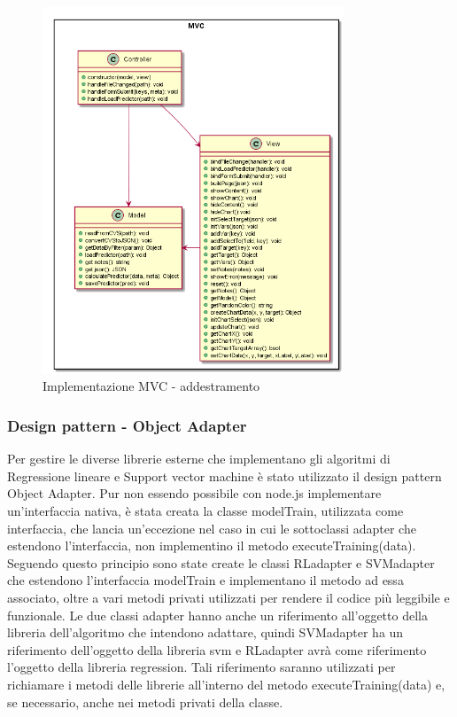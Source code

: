 \documentclass[../manuale-sviluppatore.tex]{subfiles}
\begin{document}
\begin{figure}[h]
    \begin{center}
         \includegraphics[width=9cm]{img/mvcTA.png}
         \caption{Implementazione MVC - addestramento}
         \label{fig:MVC}
     \end{center}
 \end{figure}

\subsubsection{Design pattern - Object Adapter}
\label{ssec:design_pattern_object_adapter}
Per gestire le diverse librerie esterne che implementano gli algoritmi di Regressione lineare e Support vector machine è stato utilizzato il design pattern Object Adapter.
Pur non essendo possibile con node.js implementare un'interfaccia nativa, è stata creata la classe modelTrain, utilizzata come interfaccia, che lancia un'eccezione nel caso
in cui le sottoclassi adapter che estendono l'interfaccia, non implementino il metodo executeTraining(data).
Seguendo questo principio sono state create le classi RLadapter e SVMadapter che estendono l'interfaccia modelTrain e implementano il metodo ad essa associato, oltre a vari metodi privati
utilizzati per rendere il codice più leggibile e funzionale.
Le due classi adapter hanno anche un riferimento all'oggetto della libreria dell'algoritmo che intendono adattare, quindi SVMadapter ha un riferimento dell'oggetto della libreria svm e
RLadapter avrà come riferimento l'oggetto della libreria regression. Tali riferimento saranno utilizzati per richiamare i metodi delle librerie all'interno del metodo executeTraining(data)
e, se necessario, anche nei metodi privati della classe.
\end{document}
